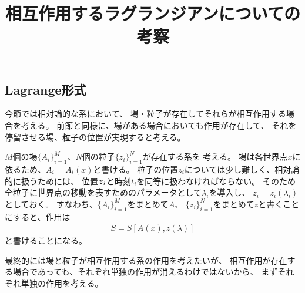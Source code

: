 \documentclass[a4paper, 10pt]{jsarticle}
\title{相互作用するラグランジアンについての考察}
\author{}
\theoremstyle{definition}
\def\vec#1{\mbox{\boldmath $#1$}}
\begin{document}
\maketitle

\setcounter{section}{1}

\subsection{Lagrange形式}
今節では相対論的な系において、
場・粒子が存在してそれらが相互作用する場合を考える。
前節と同様に、場がある場合においても作用が存在して、
それを停留させる場、粒子の位置が実現すると考える。

$M$個の場$\{A_i\}_{i=1}^{M}$、$N$個の粒子$\{z_i\}_{i=1}^N$が存在する系を
考える。
場は各世界点$x$に依るため、$A_i = A_i(x)$と書ける。
粒子の位置$z_i$については少し難しく、相対論的に扱うためには、
位置$\vec{z}_i$と時刻$t_i$を同等に扱わなければならない。
そのため全粒子に世界点の移動を表すためのパラメータとして$\lambda_i$を導入し、
$z_i = z_i (\lambda_i)$としておく。
すなわち、$\{A_i\}_{i=1}^{M}$をまとめて$A$、
$\{z_i\}_{i=1}^N$をまとめて$z$と書くことにすると、作用は
\begin{align}
	S = S[A(x), z(\lambda)]
\end{align}
と書けることになる。

最終的には場と粒子が相互作用する系の作用を考えたいが、
相互作用が存在する場合であっても、それぞれ単独の作用が消えるわけではないから、
まずそれぞれ単独の作用を考える。
\end{document}
